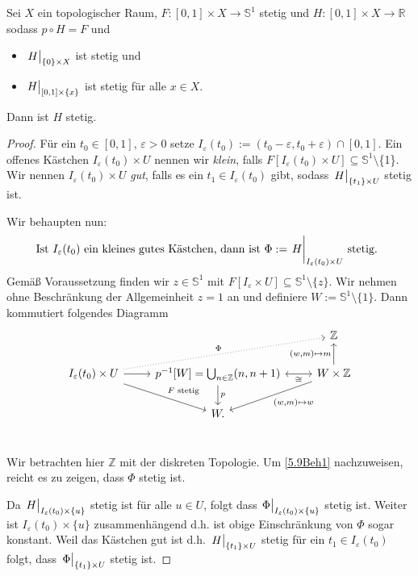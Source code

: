 \documentclass[
12pt, 
openany, 
a4paper, 
final,
fleqn, 
]{myclass}
\numberwithin{equation}{chapter}
\numberwithin{section}{chapter}
\newcommand{\ZZ}{\mathbb Z}
\newcommand{\RR}{\mathbb R}
\newcommand{\Ss}{\mathbb S}
\newcommand{\union}{\bigcup}
\newcommand{\eval}[1]{\left. \vphantom{\int}#1\right\lvert}
\newcommand{\todo}[1]{}
\renewcommand{\cite}[2][]{}
\begin{document}
\begin{lem}[{\cite[S.165, Hochhebung von Homotopien]{janich_topologie_2008}}]\label{5.7}
Sei $ X $ ein topologischer Raum, $ F: [0,1]\times X \to \mathbb{S}^{1} $ stetig und $ H:[0,1 ]\times X\to \RR $ sodass $ p\circ H = F $ und
\begin{itemize}
\item $ \eval{H}_{\{0\}\times X} $ ist stetig und 
\item $ \eval{H}_{[0, 1]\times \{x\}} $ ist stetig für alle $ x\in X $.
\end{itemize}
Dann ist $ H $ stetig. 
\end{lem}
\begin{proof}
Für ein $ t_{0}\in [0,1] $, $ \varepsilon>0 $ setze $ I_{\varepsilon}(t_{0}) := (t_{0}- \varepsilon, t_{0}+ \varepsilon)\cap [0,1] $. Ein offenes Kästchen $ I_{\varepsilon}(t_{0})\times U $ nennen wir  \emph{klein}, falls $ F[I_{\varepsilon}(t_{0})\times U]\subseteq \Ss^1 $$\setminus$\{1\}.\todo{Stimmt das $ \setminus\{1\} $?} Wir nennen $ I_{\varepsilon}(t_{0})\times U $ \emph{gut}, falls es ein $ t_{1}\in I_{\varepsilon}(t_{0}) $ gibt, sodass $ \eval H_{\{t_{1}\}\times U} $ stetig ist. 

Wir behaupten nun: 
\begin{equation}\label{5.9Beh1}
\text{Ist $ I_{\varepsilon}(t_{0}) $ ein kleines gutes Kästchen, dann ist $ \displaystyle \todo{\Phi??}\Phi:=\eval H_{I_{\varepsilon}(t_{0})\times U} $ stetig. }	
\end{equation}
Gemäß Voraussetzung finden wir $ z\in \Ss^1 $ mit $ F[I_{\varepsilon}\times U] \subseteq \Ss^1\setminus\{z\}$. Wir nehmen ohne Beschränkung der Allgemeinheit $ z=1 $ an und definiere $ W := \Ss^1\setminus\{1\} $. Dann kommutiert folgendes Diagramm
\[ 
\begin{tikzcd}
&&\ZZ \\
I_{\varepsilon}(t_{0})\times U	\arrow[dotted]{urr}{\Phi}\arrow{r}{}\arrow{dr}{F \text{ stetig}}& p^{-1}[W] = \union_{n\in \ZZ}(n, n+1) \arrow{d}{p}& \arrow[leftrightarrow]{l}{\cong}\arrow{ld}{(w, m)\mapsto w}\arrow{u}{(w, m)\mapsto m} W\times \ZZ\\
&W.&\\
\end{tikzcd}
\]
\todo{Wie ist $ \Phi $ hier gewählt??}
Wir betrachten hier $ \ZZ $ mit der diskreten Topologie. Um \eqref{5.9Beh1} nachzuweisen, reicht es zu zeigen, dass $ \Phi  $ stetig ist. 

Da $ \eval H_{I_{\varepsilon}(t_{0})\times \{u\}} $ stetig ist für alle $ u\in U $, folgt dass $ \eval{\Phi}_{I_{\varepsilon}(t_{0})\times \{u\}} $ stetig ist. Weiter ist $ I_{\varepsilon}(t_{0})\times \{u\} $ zusammenhängend d.h. ist obige Einschränkung von $ \Phi $ sogar konstant. Weil das Kästchen gut ist d.h. $ \eval H_{\{t_{1}\}\times U} $ stetig für ein $ t_{1}\in I_{\varepsilon}(t_{0}) $ folgt, dass $ \eval \Phi_{\{t_{1}\}\times U} $ stetig ist. 


\end{proof}
\end{document}
